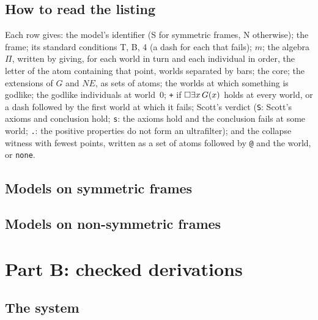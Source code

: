 \documentclass{situationist-preprint}
\newcommand{\NE}{\mathit{NE}}
\begin{document}
\subsection{How to read the listing}

Each row gives: the model's identifier (S for symmetric frames, N otherwise); the frame; its standard conditions T, B, 4 (a dash for each that fails); $m$; the algebra $\Pi$, written by giving, for each world in turn and each individual in order, the letter of the atom containing that point, worlds separated by bars; the core; the extensions of $G$ and $\NE$, as sets of atoms; the worlds at which something is godlike; the godlike individuals at world~0; \texttt{+} if $\mathord{\Box}\exists x\,G(x)$ holds at every world, or a dash followed by the first world at which it fails; Scott's verdict (\texttt{S}: Scott's axioms and conclusion hold; \texttt{s}: the axioms hold and the conclusion fails at some world; \texttt{.}: the positive properties do not form an ultrafilter); and the collapse witness with fewest points, written as a set of atoms followed by \texttt{@} and the world, or \texttt{none}.

\subsection{Models on symmetric frames}



\subsection{Models on non-symmetric frames}



\clearpage
\section{Part B: checked derivations}\label{app:derivations}

\subsection{The system}
\end{document}
